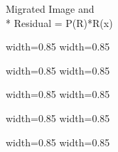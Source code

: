 \begin{frame} 
\begin{center}
 \Huge Migrated Image and \\* Residual = P(R)*R(x)
\end{center}

\end{frame}
\begin{frame}
      {width=0.85\textwidth} {}
      {width=0.85\textwidth} {}
\end{frame}
\begin{frame}
      {width=0.85\textwidth} {}
      {width=0.85\textwidth} {}
\end{frame}
\begin{frame}
      {width=0.85\textwidth} {}
      {width=0.85\textwidth} {}
\end{frame}
\begin{frame}
      {width=0.85\textwidth} {}
      {width=0.85\textwidth} {}
\end{frame}
\begin{frame}
      {width=0.85\textwidth} {}
      {width=0.85\textwidth} {}
\end{frame}

